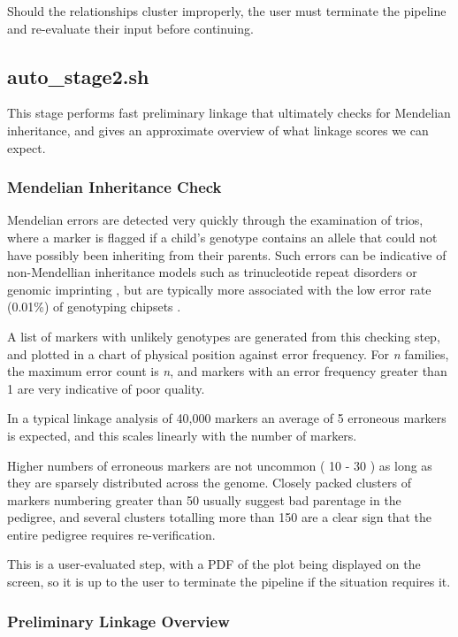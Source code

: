 Should the relationships cluster improperly, the user must terminate the pipeline and re-evaluate their input before continuing.


\subsection{auto\_stage2.sh}

This stage performs fast preliminary linkage that ultimately checks for Mendelian inheritance, and gives an approximate overview of what linkage scores we can expect.

\subsubsection{Mendelian Inheritance Check}

Mendelian errors are detected very quickly through the examination of trios, where a marker is flagged if a child's genotype contains an allele that could not have possibly been inheriting from their parents. Such errors can be indicative of non-Mendellian inheritance models such as trinucleotide repeat disorders or genomic imprinting \cite{Walker2007218}, but are typically more associated with the low error rate (0.01\%) of genotyping chipsets \citep{saunders_estimating_2007}.

A list of markers with unlikely genotypes are generated from this checking step, and plotted in a chart of physical position against error frequency. For \textit{n} families, the maximum error count is \textit{n}, and markers with an error frequency greater than 1 are very indicative of poor quality.

In a typical linkage analysis of 40,000 markers an average of 5 erroneous markers is expected, and this scales linearly with the number of markers.

Higher numbers of erroneous markers are not uncommon ( 10 - 30 ) as long as they are sparsely distributed across the genome. Closely packed clusters of markers numbering greater than 50 usually suggest bad parentage in the pedigree, and several clusters totalling more than 150 are a clear sign that the entire pedigree requires re-verification.

This is a user-evaluated step, with a PDF of the plot being displayed on the screen, so it is up to the user to terminate the pipeline if the situation requires it.


\subsubsection{Preliminary Linkage Overview}

